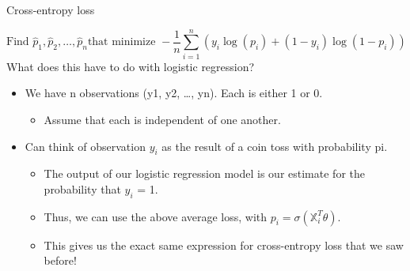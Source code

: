\documentclass[aspectratio=169]{../latex_main/tntbeamer}  %
\begin{document}
	
	\begin{frame}{Cross-entropy loss}


	   \begin{equation*}
	       \text{Find } \hat{p}_1, \hat{p}_2, \dots, \hat{p}_n\text{that minimize } -\frac{1}{n}\sum\limits_{i=1}^n(y_i\log(p_i) + (1 - y_i)\log(1-p_i))
	   \end{equation*}
   	    What does this have to do with logistic regression?
   	    \begin{itemize}
   	        \item We have n observations (y1, y2, …, yn). Each is either 1 or 0.
   	        \begin{itemize}
   	            \item Assume that each is independent of one another.
   	        \end{itemize}
   	        \item Can think of observation $y_i$ as the result of a coin toss with probability pi.
   	        \begin{itemize}
   	            \item The output of our logistic regression model is our estimate for the probability that     $y_i$ = 1.
   	            \item Thus, we can use the above average loss, with  $p_i = \sigma (\mathbb{X}_i^T\theta)$.
   	            \item This gives us the exact same expression for cross-entropy loss that we saw before!
   	        \end{itemize}
   	    \end{itemize}

	\end{frame}
	
\end{document}
